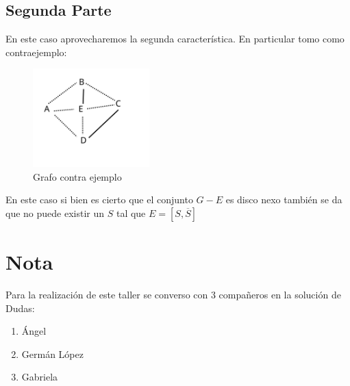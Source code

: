     \subsection*{Segunda Parte}

    En este caso aprovecharemos la segunda característica. En particular tomo como contraejemplo:
    \begin{figure}[H]
      \centering
      \includegraphics[width=0.4\textwidth]{Imagenes/grafo2}
      \caption{Grafo contra ejemplo}
      \label{fig:grafo2}
    \end{figure}

    En este caso si bien es cierto que el conjunto $G-E$ es disco nexo también se da que no puede existir un $S$ tal que $E = [S,\overline{S}]$

    \section*{Nota}

    Para la realización de este taller se converso con 3 compañeros en la solución de Dudas:
    \begin{enumerate}
      \item Ángel
      \item Germán López
      \item Gabriela
    \end{enumerate}


